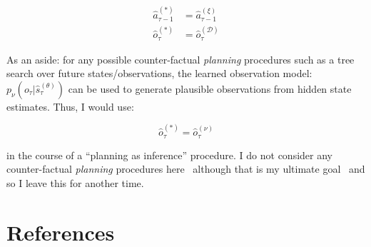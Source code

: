 \documentclass{article}
\begin{document}
\begin{equation}
    \begin{aligned}
        \label{eq:testing_notation}
        \hat{a}_{\tau - 1}^{(*)} &= \hat{a}_{\tau - 1}^{(\xi)} \\
        \hat{o}_{\tau}^{(*)} &= \hat{o}_{\tau}^{(\mathcal{D})}
    \end{aligned}
\end{equation}

As an aside: for any possible counter-factual \textit{planning} procedures such as a tree search over future states/observations, the learned observation model: $p_{\nu}(o_{\tau} | \hat{s}_{\tau}^{(\theta)})$ can be used to generate plausible observations from hidden state estimates. Thus, I would use:

\begin{equation}
    \label{eq:future_obs}
    \hat{o}_{\tau}^{(*)} = \hat{o}_{\tau}^{(\nu)}
\end{equation}

in the course of a ``planning as inference'' procedure. I do not consider any counter-factual \textit{planning} procedures here \textemdash \ although that is my ultimate goal \textemdash \ and so I leave this for another time. 

\section{References}

\printbibliography
\end{document}
